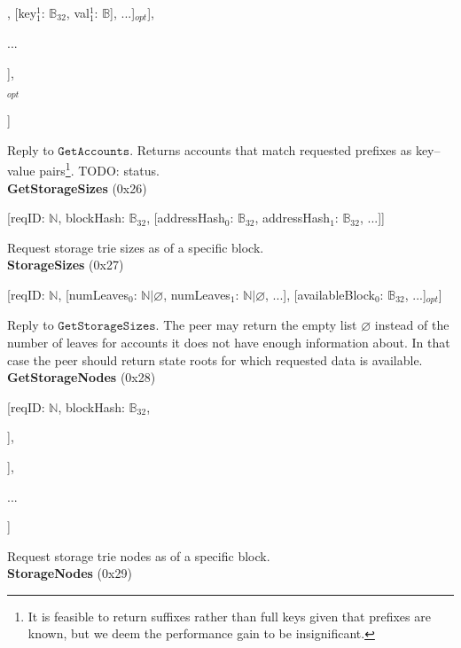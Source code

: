 \documentclass{amsart}
\begin{document}
\qquad [status$_1$: $\mathbb{N}$, [[key$^0_{1}$: $\mathbb{B}_{32}$, val$^0_{1}$: $\mathbb{B}$], [key$^1_{1}$: $\mathbb{B}_{32}$, val$^1_{1}$: $\mathbb{B}$], ...]$_{opt}$],

\qquad ...

\quad ],

$_{opt}$

]
\medskip

Reply to $\texttt{GetAccounts}$.
Returns accounts that match requested prefixes as key--value pairs\footnote{It
is feasible to return suffixes rather than full keys given that prefixes are known,
but we deem the performance gain to be insignificant.}.
TODO: status.\\

\textbf{GetStorageSizes} (0x26)

[reqID: $\mathbb{N}$, blockHash: $\mathbb{B}_{32}$,
[addressHash$_0$: $\mathbb{B}_{32}$, addressHash$_1$: $\mathbb{B}_{32}$, ...]]
\medskip

Request storage trie sizes as of a specific block.\\

\textbf{StorageSizes} (0x27)

[reqID: $\mathbb{N}$,
[numLeaves$_0$: $\mathbb{N} | \varnothing$, numLeaves$_1$: $\mathbb{N} | \varnothing$, ...],
[availableBlock$_0$: $\mathbb{B}_{32}$, ...]$_{opt}$]
\medskip

Reply to $\texttt{GetStorageSizes}$.
The peer may return the empty list $\varnothing$ instead of the number of leaves for accounts it does not have enough information about.
In that case the peer should return state roots for which requested data is available.\\

\textbf{GetStorageNodes} (0x28)

[reqID: $\mathbb{N}$, blockHash: $\mathbb{B}_{32}$,

\quad [addressHash$^0$: $\mathbb{B}_{32}$, [prefix$^0_0$: $\mathbb{Y}$, prefix$^0_1$: $\mathbb{Y}$, ...]],

\quad [addressHash$^1$: $\mathbb{B}_{32}$, [prefix$^1_0$: $\mathbb{Y}$, prefix$^1_1$: $\mathbb{Y}$, ...]],

\quad ...

]
\medskip

Request storage trie nodes as of a specific block.\\

\textbf{StorageNodes} (0x29)
\end{document}
